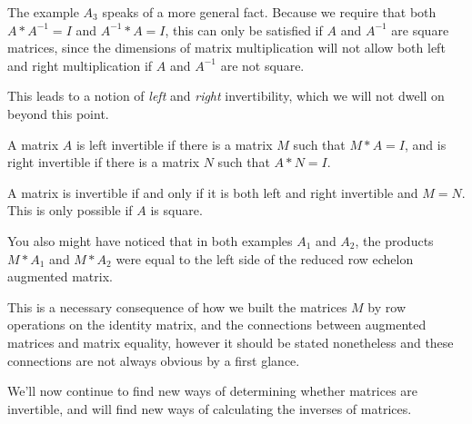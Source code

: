 \documentclass{ximera}
\begin{document}
\begin{remark}
  The example $A_3$ speaks of a more general fact. Because we require that both $A*A^{-1}=I$ and $A^{-1}*A=I$, this can only be satisfied if $A$ and $A^{-1}$ are square matrices, since the dimensions of matrix multiplication will not allow both left and right multiplication if $A$ and $A^{-1}$ are not square. 

  This leads to a notion of \emph{left} and \emph{right} invertibility, which we will not dwell on beyond this point.
\end{remark}

\begin{definition}

  A matrix $A$ is left invertible if there is a matrix $M$ such that $M*A=I$, and is right invertible if there is a matrix $N$ such that $A*N=I$. 
  
  A matrix is invertible if and only if it is both left and right invertible and $M=N$. This is only possible if $A$ is square.
\end{definition}

\begin{remark}
  You also might have noticed that in both examples $A_1$ and $A_2$, the products $M*A_1$ and $M*A_2$ were equal to the left side of the reduced row echelon augmented matrix. 

  This is a necessary consequence of how we built the matrices $M$ by row operations on the identity matrix, and the connections between augmented matrices and matrix equality, however it should be stated nonetheless and these connections are not always obvious by a first glance.
\end{remark}

We'll now continue to find new ways of determining whether matrices are invertible, and will find new ways of calculating the inverses of matrices.
\end{document}
